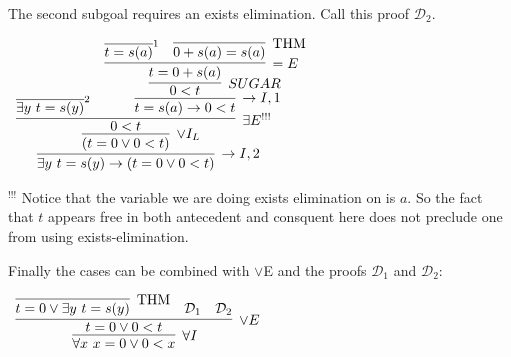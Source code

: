 \documentclass[11pt]{report}
\newcommand{\temp}[2]{{\overline{#2}}^{#1}}
\begin{document}
\begin{enumerate}
\begin{enumerate}
			The second subgoal requires an exists elimination. Call this proof $\mathcal{D}_{2}$.
			
			\begin{center}
				$\begin{array}{c}
					\infer[\to I,2]{\exists y \ t = s(y) \to (t = 0 \lor 0 < t)}
						{\infer[\lor I_{L}]{(t = 0 \lor 0 < t)}
							{\infer[\exists E^{!!!}]{0 < t}
								{\temp{2}{\exists y \ t = s(y)}
								&
								\infer[\to I,1]{t = s(a) \to 0 < t}
									{\infer[SUGAR]{0 < t}
										{\infer[=E]{t = 0 + s(a)}
											{\temp{1}{t = s(a)}
											&
											\infer[\THM]{0 + s(a) = s(a)}
												{}}}}}}}
				\end{array}$
			\end{center}
			
			$^{!!!}$ Notice that the variable we are doing exists elimination on is $a$. So the fact that $t$ appears free in both antecedent and consquent here does not preclude one from using exists-elimination.
			
			Finally the cases can be combined with $\lor$E and the proofs $\mathcal{D}_{1}$ and $\mathcal{D}_{2}$: 
			
			\begin{center}
				$\begin{array}{c}
					\infer[\forall I]{\forall x \ x = 0 \lor 0 < x}
						{\infer[\lor E]{t = 0 \lor 0 < t}
							{\infer[\THM]{t = 0 \lor \exists y \ t = s(y)}{}
							&
							\mathcal{D}_{1}
							&
							\mathcal{D}_{2}}}
				\end{array}$
			\end{center}
			
			
%			
%			
		\end{enumerate}
	 
\end{enumerate}	
\end{document}
